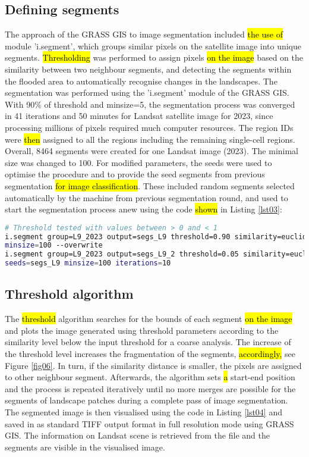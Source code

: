 \documentclass[sustainability,article,submit,pdftex,moreauthors]{Definitions/mdpi}
\begin{document}
\subsection{Defining segments}
The approach of the GRASS GIS to image segmentation included \hl{the use of }module 'i.segment', which groups similar pixels on the satellite image into unique segments.\hl{ Thresholding} was performed to assign pixels \hl{on the image }based on the similarity between two neighbour segments, and detecting the segments within the flooded area to automatically recognise changes in the landscapes. The segmentation was performed using the 'i.segment' module of the GRASS GIS. With 90\% of threshold and minsize=5, the segmentation process was converged in 41 iterations and 50 minutes for Landsat satellite image for 2023, since processing millions of pixels required much computer resources. The region IDs were \hl{then }assigned to all the regions including the remaining single-cell regions. Overall, 8464 segments were created for one Landsat image (2023). The minimal size was changed to 100. For modified parameters, the seeds were used to optimise the procedure and to provide the seed segments from\hl{ }previous segmentation \hl{for image classification}. These included random segments selected automatically by the machine from previous segmentation round, and used to start the segmentation process anew using the code \hl{shown} in Listing \ref{lst03}:

\begin{lstlisting}[language=bash,caption=GRASS GIS code for segmentation for image tested with 2 levels of threshold,style=mystyle,label={lst03}]
# Threshold tested with values between > 0 and < 1
i.segment group=L9_2023 output=segs_L9 threshold=0.90 similarity=euclidean method=region_growing
minsize=100 --overwrite
i.segment group=L9_2023 output=segs_L9_2 threshold=0.05 similarity=euclidean method=region_growing
seeds=segs_L9 minsize=100 iterations=10
\end{lstlisting} 

\subsection{Threshold algorithm}
The \hl{threshold }algorithm searches for the bounds of each segment \hl{on the image }and plots the image generated using threshold parameters according to the similarity level below the input threshold for a coarse analysis. The increase of the threshold level increases the fragmentation of the segments, \hl{accordingly, }see Figure \ref{fig06}. In turn, if the similarity distance is smaller, the pixels are assigned to other neighbour segment. Afterwards, the algorithm sets \hl{a }start-end position and the process is repeated iteratively until no more merges are possible for the segments of landscape patches during a complete pass of image segmentation. The segmented image is then visualised using the code in Listing \ref{lst04} and saved in as standard TIFF output format in full resolution mode using GRASS GIS. The information on Landsat scene is retrieved from the file and the segments are visible in the visualised image. 
\end{document}
